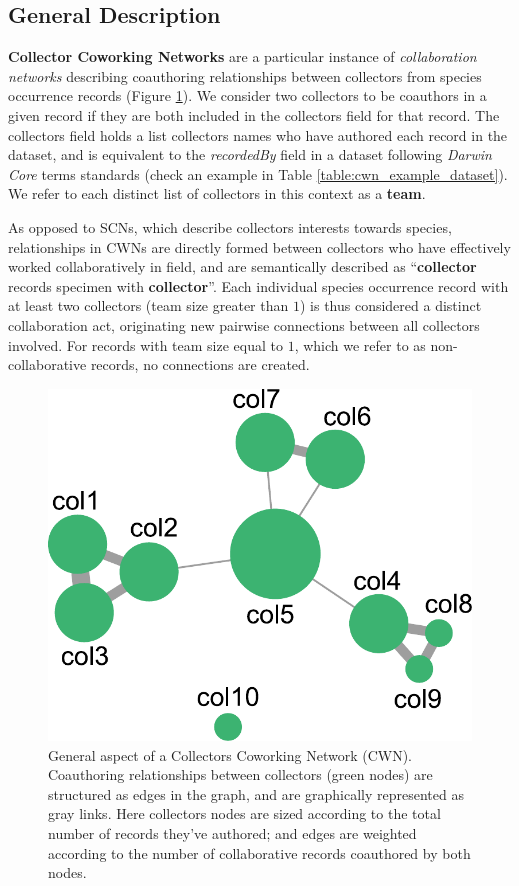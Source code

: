 {\subsection{General Description}
\textbf{Collector Coworking Networks} are a particular instance of \textit{collaboration networks} describing coauthoring relationships between collectors from species occurrence records (Figure \ref{fig:cwn_general}).
We consider two collectors to be coauthors in a given record if they are both included in the collectors field for that record. The collectors field holds a list collectors names who have authored each record in the dataset, and is equivalent to the \textit{recordedBy} field in a dataset following \textit{Darwin Core} terms standards (check an example in Table \ref{table:cwn_example_dataset}). We refer to each distinct list of collectors in this context as a \textbf{team}.

As opposed to SCNs, which describe collectors interests towards species, relationships in CWNs are directly formed between collectors who have effectively worked collaboratively in field, and are semantically described as ``\textbf{collector} records specimen with \textbf{collector}''.
Each individual species occurrence record with at least two collectors (team size greater than $1$) is thus considered a distinct collaboration act, originating new pairwise connections between all collectors involved.
For records with team size equal to $1$, which we refer to as non-collaborative records, no connections are created.

  \begin{figure}[h!]
  	\centering
    \includegraphics[width=.4\linewidth]{figures/network_models/cwn_generalaspect.pdf}
    \caption{General aspect of a Collectors Coworking Network (CWN). Coauthoring relationships between collectors (green nodes) are structured as edges in the graph, and are graphically represented as gray links.
    Here collectors nodes are sized according to the total number of records they've authored; and edges are weighted according to the number of collaborative records coauthored by both nodes.}
    \label{fig:cwn_general}
  \end{figure}

}
